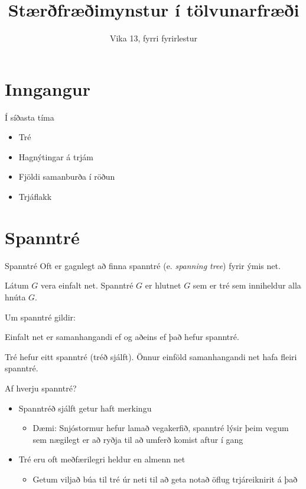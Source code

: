 \documentclass{beamer}
\title{Stærðfræðimynstur í tölvunarfræði}
\subtitle{Vika 13, fyrri fyrirlestur}
\begin{document}
\begin{frame}
\titlepage
\end{frame}


\section{Inngangur}

\begin{frame}{Í síðasta tíma}
\begin{itemize}
 \item Tré
 \item Hagnýtingar á trjám
 \item Fjöldi samanburða í röðun
 \item Trjáflakk
\end{itemize}
\end{frame}

\section{Spanntré}

\begin{frame}{Spanntré}
Oft er gagnlegt að finna spanntré (e. \emph{spanning tree}) fyrir ýmis net.
\begin{tcolorbox}[title=Spanntré]
Látum $G$ vera einfalt net. Spanntré $G$ er hlutnet $G$ sem er tré sem inniheldur alla hnúta $G$.
\end{tcolorbox}
Um spanntré gildir:
\begin{tcolorbox}
Einfalt net er samanhangandi ef og aðeins ef það hefur spanntré.
\end{tcolorbox}
Tré hefur eitt spanntré (tréð sjálft). Önnur einföld samanhangandi net hafa fleiri spanntré.
\end{frame}

\begin{frame}{Af hverju spanntré?}
\begin{itemize}
 \item Spanntréð sjálft getur haft merkingu
 \begin{itemize}
  \item Dæmi: Snjóstormur hefur lamað vegakerfið, spanntré lýsir þeim vegum sem nægilegt er að ryðja til að umferð komist aftur í gang
 \end{itemize}
 \item Tré eru oft meðfærilegri heldur en almenn net
 \begin{itemize}
  \item Getum viljað búa til tré úr neti til að geta notað öflug trjáreiknirit á það
 \end{itemize}
\end{itemize}
\end{frame}
\end{document}
